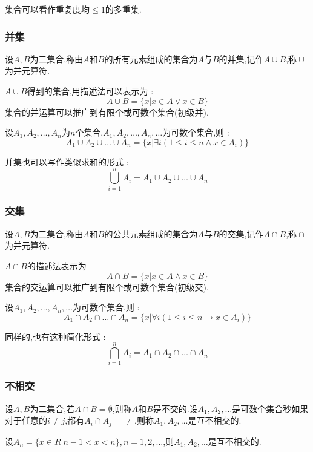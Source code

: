 \documentclass[UTF8,12pt]{ctexbook}
\newcommand{\updownUnion}[2]{\bigcup\limits_{#2}^{#1}}
\DeclareMathOperator{\unionSet}{\cup}
\DeclareMathOperator{\intersectionSet}{\cap}
\begin{document}
{{{{{  集合可以看作重复度均$\leq 1$的多重集.
}%

\subsubsection{并集}{
  设$A,B$为二集合,称由$A$和$B$的所有元素组成的集合为$A$与$B$的并集,记作$A \unionSet B$,称$\unionSet$为并元算符.

  $A \unionSet B$得到的集合,用描述法可以表示为 : $$
    A \unionSet B = \{x | x \in A \lor x \in B\}
  $$
  集合的并运算可以推广到有限个或可数个集合(初级并).

  设$A_1,A_2,\dots,A_n$为$n$个集合,$A_1,A_2,\dots,A_n,\dots$为可数个集合,则 : $$
    A_1 \unionSet A_2 \unionSet \dots \unionSet A_n = \{x | \exists i (1 \leq i \leq n \land x \in A_i)\}
  $$

  并集也可以写作类似求和的形式 : $$
    \updownUnion{n}{i = 1}A_i = A_1 \unionSet A_2 \unionSet \dots \unionSet A_n
  $$

}%

\subsubsection{交集}{
  设$A,B$为二集合,称由$A$和$B$的公共元素组成的集合为$A$与$B$的交集,记作$A \intersectionSet B$,称$\intersectionSet$为并元算符.

  $A \intersectionSet B$的描述法表示为$$
    A \intersectionSet B = \{x | x \in A \land x \in B\}
  $$
  集合的交运算可以推广到有限个或可数个集合(初级交).

  设$A_1,A_2,\dots,A_n,\dots$为可数个集合,则 : $$
    A_1 \intersectionSet A_2 \intersectionSet \dots \intersectionSet A_n = \{x | \forall i (1 \leq i \leq n \to x \in A_i)\}
  $$

  同样的,也有这种简化形式 : $$
    \bigcap\limits_{i = 1}^{n}A_i = A_1 \intersectionSet A_2 \intersectionSet \dots \intersectionSet A_n
  $$
}%

\subsubsection{不相交}{
  设$A,B$为二集合,若$A \intersectionSet B = \emptyset$,则称$A$和$B$是不交的.设$A_1,A_2,\dots$是可数个集合秒如果对于任意的$i \neq j$,都有$A_i \intersectionSet A_j = \neq$,则称$A_1,A_2,\dots$是互不相交的.

  设$A_n = \{x \in R | n - 1 < x < n\},n = 1,2,\dots$,则$A_1,A_2,\dots$是互不相交的.
}%

}}}}
\end{document}
